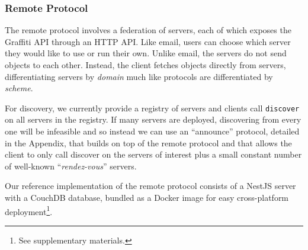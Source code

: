 



\subsubsection{Remote Protocol}
\label{above-and-below:remote-protocol}

The remote protocol involves a federation of servers,
each of which exposes the Graffiti API through an HTTP API.
Like email, users can choose which server they would
like to use or run their own.
Unlike email, the servers do not send objects to each other.
Instead, the client fetches objects directly from servers,
differentiating servers by \emph{domain} much like
protocols are differentiated by \emph{scheme}.

For discovery, we currently provide a registry of servers
and clients call \texttt{discover} on all servers in the registry.
If many servers are deployed, discovering from every one
will be infeasible and so instead we can use an ``announce''
protocol, detailed in the Appendix, that builds on top of the remote protocol and
that allows the client to only call discover on the servers
of interest
plus a small constant number of well-known
``\emph{rendez-vous}'' servers.

Our reference implementation of the remote protocol
consists of a NestJS server with a CouchDB database,
bundled as a Docker image for easy cross-platform
deployment\footnote{
See supplementary materials.
}.

